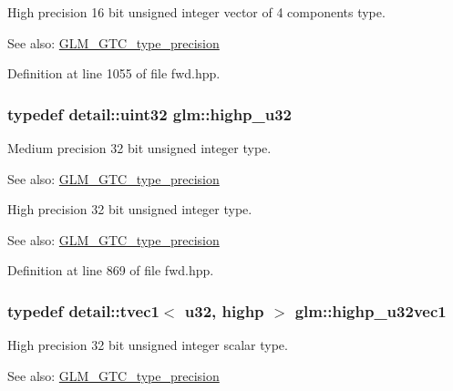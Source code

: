 High precision 16 bit unsigned integer vector of 4 components type. \begin{Desc}
\item[See also:]\hyperlink{group__gtc__type__precision}{GLM\_\-GTC\_\-type\_\-precision} \end{Desc}


Definition at line 1055 of file fwd.hpp.\hypertarget{group__gtc__type__precision_ge8e8a2c712653891a03c171795286ac5}{
\subsubsection[highp\_\-u32]{\setlength{\rightskip}{0pt plus 5cm}typedef detail::uint32 {\bf glm::highp\_\-u32}}}
\label{group__gtc__type__precision_ge8e8a2c712653891a03c171795286ac5}


Medium precision 32 bit unsigned integer type. \begin{Desc}
\item[See also:]\hyperlink{group__gtc__type__precision}{GLM\_\-GTC\_\-type\_\-precision}\end{Desc}
High precision 32 bit unsigned integer type. \begin{Desc}
\item[See also:]\hyperlink{group__gtc__type__precision}{GLM\_\-GTC\_\-type\_\-precision} \end{Desc}


Definition at line 869 of file fwd.hpp.\hypertarget{group__gtc__type__precision_g8a92d1f79e2fd4a03be803e35aac8e1b}{
\subsubsection[highp\_\-u32vec1]{\setlength{\rightskip}{0pt plus 5cm}typedef detail::tvec1$<$ u32, highp $>$ {\bf glm::highp\_\-u32vec1}}}
\label{group__gtc__type__precision_g8a92d1f79e2fd4a03be803e35aac8e1b}


High precision 32 bit unsigned integer scalar type. \begin{Desc}
\item[See also:]\hyperlink{group__gtc__type__precision}{GLM\_\-GTC\_\-type\_\-precision} \end{Desc}


